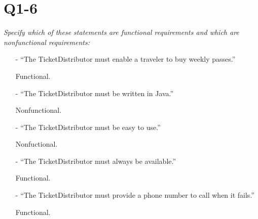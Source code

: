 \section{Q1-6}
\emph{Specify which of these statements are functional requirements and which are nonfunctional requirements:}

\begin{itemize}
\item[-]“The TicketDistributor must enable a traveler to buy weekly passes.”	

Functional.
\item[-]“The TicketDistributor must be written in Java.”	

Nonfunctional.
\item[-]“The TicketDistributor must be easy to use.”	

Nonfuctional.
\item[-]“The TicketDistributor must always be available.”	

Functional.
\item[-]“The TicketDistributor must provide a phone number to call when it fails.”	

Functional.
\end{itemize}